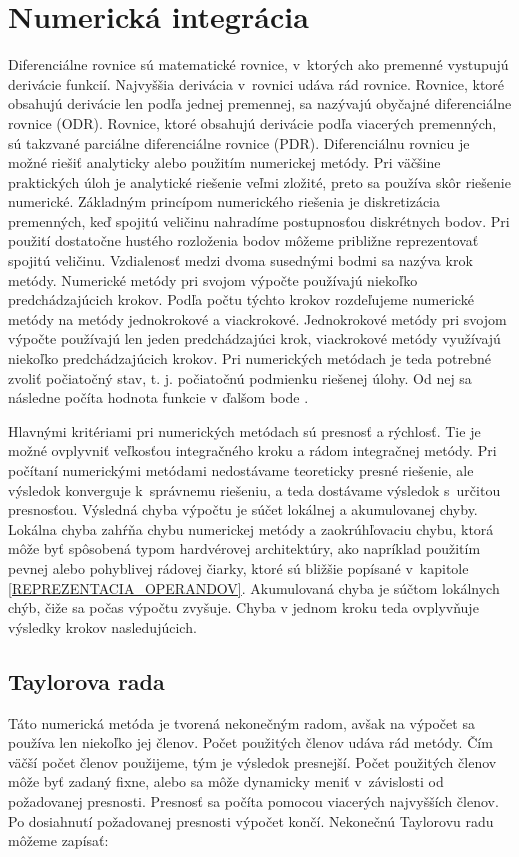 \chapter{Numerická integrácia} \label{NUM_INTEGRACIA}


Diferenciálne rovnice sú matematické rovnice, v~ktorých ako premenné vystupujú derivácie funkcií. Najvyššia derivácia v~rovnici udáva rád rovnice. Rovnice, ktoré obsahujú derivácie len podľa jednej premennej, sa nazývajú obyčajné diferenciálne rovnice (ODR). Rovnice, ktoré obsahujú derivácie podľa viacerých premenných, sú takzvané parciálne diferenciálne rovnice (PDR).
Diferenciálnu rovnicu je možné riešiť analyticky alebo použitím numerickej metódy. Pri väčšine praktických úloh je analytické riešenie veľmi zložité, preto sa používa skôr riešenie numerické. Základným princípom numerického riešenia je diskretizácia premenných, keď spojitú veličinu nahradíme postupnosťou diskrétnych bodov. Pri použití dostatočne hustého rozloženia bodov môžeme približne reprezentovať spojitú veličinu. Vzdialenosť medzi dvoma susednými bodmi sa nazýva krok metódy. Numerické metódy pri svojom výpočte používajú niekoľko predchádzajúcich krokov. Podľa počtu týchto krokov rozdeľujeme numerické metódy na metódy jednokrokové a viackrokové. Jednokrokové metódy pri svojom výpočte používajú len jeden predchádzajúci krok, viackrokové metódy využívajú niekoľko predchádzajúcich krokov. Pri numerických metódach je teda potrebné zvoliť počiatočný stav, t. j. počiatočnú podmienku riešenej úlohy. Od nej sa následne počíta hodnota funkcie v ďalšom bode \cite{NumMetody}. 

Hlavnými kritériami pri numerických metódach sú presnosť a rýchlosť. Tie je možné ovplyvniť veľkosťou integračného kroku a rádom integračnej metódy. Pri počítaní numerickými metódami nedostávame teoreticky presné riešenie, ale výsledok konverguje k~správnemu riešeniu, a teda dostávame výsledok s~určitou presnosťou. Výsledná chyba výpočtu je súčet lokálnej a akumulovanej chyby.  Lokálna chyba zahŕňa chybu numerickej metódy a zaokrúhľovaciu chybu, ktorá môže byť spôsobená typom hardvérovej architektúry, ako napríklad použitím pevnej alebo pohyblivej rádovej čiarky, ktoré sú bližšie popísané v~kapitole \ref{REPREZENTACIA_OPERANDOV}. Akumulovaná chyba je súčtom lokálnych chýb, čiže sa počas výpočtu zvyšuje. Chyba v jednom kroku teda ovplyvňuje výsledky krokov nasledujúcich.


\section{Taylorova rada}
Táto numerická metóda je tvorená nekonečným radom, avšak na výpočet sa používa len niekoľko jej členov. Počet použitých členov udáva rád metódy. Čím väčší počet členov použijeme, tým je výsledok presnejší. Počet použitých členov môže byť zadaný fixne, alebo sa môže dynamicky meniť v~závislosti od požadovanej presnosti. Presnosť sa počíta pomocou viacerých najvyšších členov. Po dosiahnutí požadovanej presnosti výpočet končí.
Nekonečnú Taylorovu radu môžeme zapísať:

